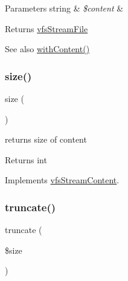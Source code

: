 \begin{DoxyParams}[1]{Parameters}
string & {\em \$content} & \\
\hline
\end{DoxyParams}
\begin{DoxyReturn}{Returns}
\mbox{\hyperlink{classorg_1_1bovigo_1_1vfs_1_1vfs_stream_file}{vfs\+Stream\+File}} 
\end{DoxyReturn}
\begin{DoxySeeAlso}{See also}
\mbox{\hyperlink{classorg_1_1bovigo_1_1vfs_1_1vfs_stream_file_a02f4f68a56cc7695c22739e95a8b785c}{with\+Content()}} 
\end{DoxySeeAlso}
\mbox{\label{classorg_1_1bovigo_1_1vfs_1_1vfs_stream_file_a775bfb88c1bb7975d67f277eade2a1b7}} 
\subsubsection{\texorpdfstring{size()}{size()}}
{\footnotesize\ttfamily size (\begin{DoxyParamCaption}{ }\end{DoxyParamCaption})}

returns size of content

\begin{DoxyReturn}{Returns}
int 
\end{DoxyReturn}


Implements \mbox{\hyperlink{interfaceorg_1_1bovigo_1_1vfs_1_1vfs_stream_content_a775bfb88c1bb7975d67f277eade2a1b7}{vfs\+Stream\+Content}}.

\mbox{\label{classorg_1_1bovigo_1_1vfs_1_1vfs_stream_file_a1622693a343bd0e33572355ac7001f72}} 
\subsubsection{\texorpdfstring{truncate()}{truncate()}}
{\footnotesize\ttfamily truncate (\begin{DoxyParamCaption}\item[{}]{\$size }\end{DoxyParamCaption})}

